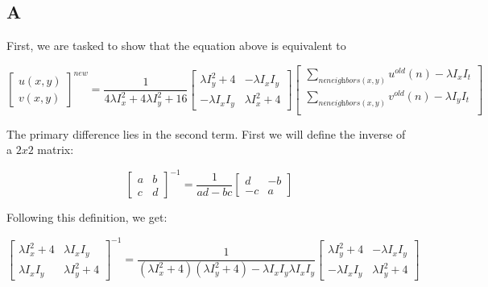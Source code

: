 \documentclass{article}
\begin{document}
\subsection*{A}

First, we are tasked to show that the equation above is equivalent to 

\begin{equation}
    \begin{bmatrix}
        u(x,y) \\
        v(x,y)
    \end{bmatrix}^{new} =
    \frac{1}{4 \lambda I_x^2 + 4\lambda I_y^2 + 16}
    \begin{bmatrix}
        \lambda I_y^2 + 4 & -\lambda I_x I_y \\
        -\lambda I_x I_y & \lambda I_x^2 + 4
    \end{bmatrix}
    \begin{bmatrix}
        \sum_{n\epsilon \textit{neighbors}(x,y)} u^{old}(n)-\lambda I_x I_t \\
        \sum_{n\epsilon \textit{neighbors}(x,y)} v^{old}(n)-\lambda I_y I_t \\
    \end{bmatrix}
\end{equation}

\noindent The primary difference lies in the second term. First we will define the inverse of a $2x2$ matrix:

\begin{equation}
    \begin{bmatrix}
        a & b \\
        c & d
    \end{bmatrix}^{-1} =
    \frac{1}{ad-bc}
    \begin{bmatrix}
        d & -b \\
        -c & a
    \end{bmatrix}
\end{equation}

\noindent Following this definition, we get:

\begin{equation}
    \begin{bmatrix}
        \lambda I_x^2 + 4 & \lambda I_x I_y \\
        \lambda I_x I_y & \lambda I_y^2 + 4
    \end{bmatrix}^{-1} =
    \frac{1}{(\lambda I_x^2 + 4)(\lambda I_y^2 + 4)- \lambda I_x I_y \lambda I_x I_y}
    \begin{bmatrix}
        \lambda I_y^2 + 4 & -\lambda I_x I_y \\
        -\lambda I_x I_y & \lambda I_y^2 + 4
    \end{bmatrix}
\end{equation}
\end{document}
